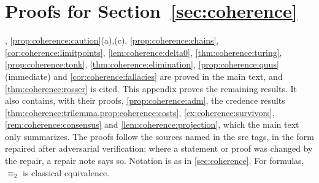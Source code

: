 \providecommand{\Steps}{\mathrm{Steps}}
\providecommand{\Taut}{\mathrm{Taut}}
\providecommand{\Cai}{C_{\mathrm{ai}}}
\providecommand{\CFm}{C_{\Fm}}
\providecommand{\Cadm}{C_{\mathrm{adm}}}
\providecommand{\BV}{\mathrm{BV}}
\providecommand{\TTs}{\mathrm{TT}}
\providecommand{\RobQ}{\mathsf{Q}}
\providecommand{\valtop}{v_{\top}}
\providecommand{\valtaut}{v_{\Taut}}
\providecommand{\hstar}{h^{*}}
\providecommand{\dstar}{\der^{*}}

\section{Proofs for Section~\ref{sec:coherence}}\label{app:coherence}

, \cref{prop:coherence:caution}(a),(c), \cref{prop:coherence:chains}, \cref{cor:coherence:limitpoints}, \cref{lem:coherence:delta0}, \cref{thm:coherence:turing}, \cref{prop:coherence:tonk}, \cref{thm:coherence:elimination}, \cref{prop:coherence:quus} (immediate) and \cref{cor:coherence:fallacies} are proved in the main text, and \cref{thm:coherence:rosser} is cited. This appendix proves the remaining results. It also contains, with their proofs, \cref{prop:coherence:adm}, the credence results \cref{thm:coherence:trilemma,prop:coherence:costs}, \cref{ex:coherence:survivors}, \cref{rem:coherence:consensus} and \cref{lem:coherence:projection}, which the main text only summarizes. The proofs follow the sources named in the \textsf{src} tags, in the form repaired after adversarial verification; where a statement or proof was changed by the repair, a repair note says so. Notation is as in \cref{sec:coherence}. For formulas, $\equiv_2$ is classical equivalence.

